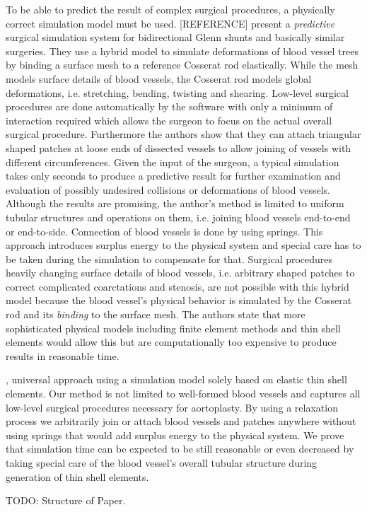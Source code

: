 To be able to predict the result of complex surgical procedures, a physically correct simulation model must be used. 
[REFERENCE] present a \emph{predictive} surgical simulation system for bidirectional Glenn shunts and basically similar surgeries. 
They use a hybrid model to simulate deformations of blood vessel trees by binding a surface mesh to a reference Cosserat rod elastically.
While the mesh models surface details of blood vessels, the Cosserat rod models global deformations, i.e. stretching, bending, twisting and shearing. 
Low-level surgical procedures are done automatically by the software with only a minimum of interaction required which allows the surgeon to focus on the actual overall surgical procedure. 
Furthermore the authors show that they can attach triangular shaped patches at loose ends of dissected vessels to allow joining of vessels with different circumferences. 
Given the input of the surgeon, a typical simulation takes only seconds to produce a predictive result for further examination and evaluation of possibly undesired collisions or deformations of blood vessels. 
Although the results are promising, the author's method is limited to uniform tubular structures and operations on them, i.e. joining blood vessels end-to-end or end-to-side. 
Connection of blood vessels is done by using springs. 
This approach introduces surplus energy to the physical system and special care has to be taken during the simulation to compensate for that. 
Surgical procedures heavily changing surface details of blood vessels, i.e. arbitrary shaped patches to correct complicated coarctations and stenosis, are not possible with this hybrid model because the blood vessel's physical behavior is simulated by the Cosserat rod and its \emph{binding} to the surface mesh. 
The authors state that more sophisticated physical models including finite element methods and thin shell elements would allow this but are computationally too expensive to produce results in reasonable time.


 , universal approach using a simulation model solely based on elastic thin shell elements. 
Our method is not limited to well-formed blood vessels and captures all low-level surgical procedures necessary for aortoplasty. 
By using a relaxation process we arbitrarily join or attach blood vessels and patches anywhere without using springs that would add surplus energy to the physical system. 
We prove that simulation time can be expected to be still reasonable or even decreased by taking special care of the blood vessel's overall tubular structure during generation of thin shell elements.

TODO: Structure of Paper.
